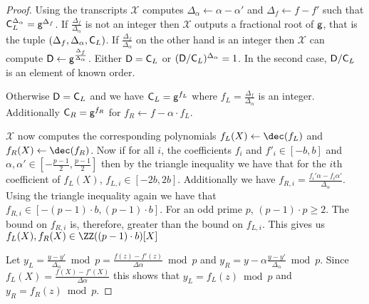 \begin{proof}
	Using the transcripts $\mathcal{X}$ computes $\Delta_\alpha\gets\alpha-\alpha'$ and $\Delta_f\gets f-f'$ such that $\mathsf{C}_{L}^{\Delta_\alpha}=\mathsf{g}^{\Delta_f}$. 
 If $\frac{\Delta_f}{\Delta_\alpha}$ is not an integer then $\mathcal{X}$ outputs a fractional root of $\mathsf{g}$, that is the tuple $(\Delta_f,\Delta_\alpha,\mathsf{C}_{L})$.  
 If $\frac{\Delta_f}{\Delta_\alpha}$ on the other hand is an integer then $\mathcal{X}$ can compute $\mathsf{D}\gets\mathsf{g}^{\frac{\Delta_f}{\Delta_\alpha}}$. Either $\mathsf{D}=\mathsf{C}_{L}$ or $(\mathsf{D}/\mathsf{C}_{L})^{\Delta_\alpha}=1$. In the second case, $\mathsf{D}/\mathsf{C}_{L}$ is an element of known order.
   
  Otherwise $\mathsf{D} = \mathsf{C}_L$ and we have $\mathsf{C}_{L}=\mathsf{g}^{f_L}$ where $f_L=\frac{\Delta_f}{\Delta_\alpha}$ is an integer.
Additionally $\mathsf{C}_R=\mathsf{g}^{f_R}$ for $f_R\gets f-\alpha \cdot f_L$.

$\mathcal{X}$ now computes the corresponding polynomials $f_L(X)\gets \dec(f_L)$ and $f_R(X)\gets \dec(f_R)$.
Now if for all $i$, the coefficients $f_i$ and $f'_i\in [-b,b]$ and $\alpha,\alpha' \in [-\frac{p-1}{2},\frac{p-1}{2}]$ then by the triangle inequality we have that for the $i$th coefficient of $f_L(X)$, $f_{L,i}\in [-2b,2b]$. Additionally we have $f_{R,i}=\frac{f_i'\alpha-f_i \alpha'}{\Delta_\alpha}$. Using the triangle inequality again we have that $f_{R,i} \in [-(p-1) \cdot b, (p-1) \cdot b]$. For an odd prime $p$, $(p-1)\cdot p\geq 2$. The bound on $f_{R,i}$ is, therefore, greater than the bound on $f_{L,i}$. This gives us $f_L(X),f_R(X)\in \ZZ({(p-1) \cdot b})[X]$

Let $y_L=\frac{y-y'}{\Delta_\alpha} \bmod p=\frac{f(z)-f'(z)}{\Delta \alpha} \bmod p$ and $y_R= y-\alpha\frac{y-y'}{\Delta_\alpha} \bmod p$. Since $f_L(X)=\frac{f(X)-f'(X)}{\Delta \alpha}$ this shows that $y_L=f_L(z)\bmod p$ and $y_R=f_R(z)\bmod p$.
\end{proof}

\def\thetheorem{\ref{thm:polycommitsecurity}}
\begin{theorem}
\maintheorem
\end{theorem}




